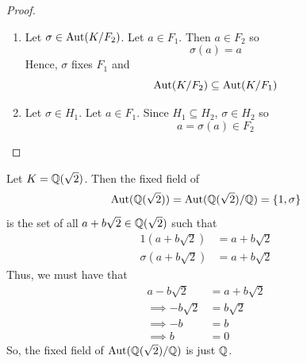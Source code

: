 \begin{proof}
    \begin{enumerate}
        \item Let $\sigma \in \text{Aut}(K/ F_2)$. Let $a \in F_1$. Then $a \in F_2$ so 
        $$\sigma(a) = a$$
        Hence, $\sigma$ fixes $F_1$ and 
        $$\text{Aut}(K/F_2) \subseteq \text{Aut}(K/F_1)$$

        \item Let $\sigma \in H_1.$ Let $a \in F_1$. Since $H_1 \subseteq H_2$, $\sigma \in H_2$ so
        $$a = \sigma(a) \in F_2$$
    \end{enumerate}
\end{proof}

\begin{example}
    Let $K = \mathbb{Q}(\sqrt{2})$. Then the fixed field of 
    $$\text{Aut}(\mathbb{Q}(\sqrt{2})) = \text{Aut}(\mathbb{Q}(\sqrt{2})/\mathbb{Q}) = \left\{1, \sigma\right\}$$
    is the set of all $a+b\sqrt{2} \in \mathbb{Q}(\sqrt{2})$ such that 
    \begin{align*}
        1(a + b\sqrt{2}) &= a + b\sqrt{2} \\
        \sigma(a + b\sqrt{2}) &= a + b\sqrt{2}
    \end{align*}
    Thus, we must have that 
    \begin{align*}
        a-b\sqrt{2} &= a+b\sqrt{2} \\
        \implies -b\sqrt{2} &= b\sqrt{2} \\
        \implies -b &= b \\
        \implies b &= 0
    \end{align*}
    So, the fixed field of $\text{Aut}(\mathbb{Q}(\sqrt{2})/\mathbb{Q})$ is just $\mathbb{Q}$.
\end{example}

